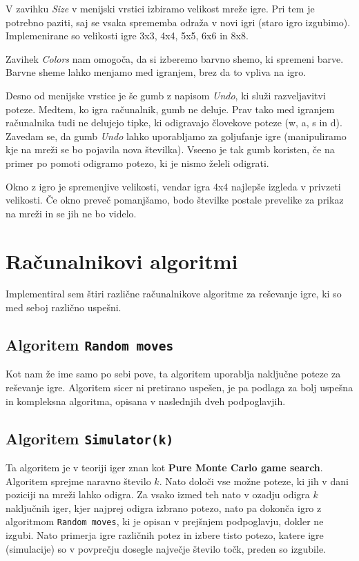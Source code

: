 \documentclass{article}
\begin{document}
V zavihku \emph{Size} v menijski vrstici izbiramo velikost mreže igre. Pri tem je potrebno paziti, saj se vsaka sprememba odraža v novi igri (staro igro izgubimo). Implemenirane so velikosti igre 3x3, 4x4, 5x5, 6x6 in 8x8.

Zavihek \emph{Colors} nam omogoča, da si izberemo barvno shemo, ki spremeni barve. Barvne sheme lahko menjamo med igranjem, brez da to vpliva na igro.

Desno od menijske vrstice je še gumb z napisom \emph{Undo}, ki služi razveljavitvi poteze. Medtem, ko igra računalnik, gumb ne deluje. Prav tako med igranjem računalnika tudi ne delujejo tipke, ki odigravajo človekove poteze (w, a, s in d). Zavedam se, da gumb \emph{Undo} lahko uporabljamo za goljufanje igre (manipuliramo kje na mreži se bo pojavila nova številka). Vseeno je tak gumb koristen, če na primer po pomoti odigramo potezo, ki je nismo želeli odigrati.

Okno z igro je spremenjive velikosti, vendar igra 4x4 najlepše izgleda v privzeti velikosti. Če okno preveč pomanjšamo, bodo številke postale prevelike za prikaz na mreži in se jih ne bo videlo.

\section{Računalnikovi algoritmi}

Implementiral sem štiri različne računalnikove algoritme za reševanje igre, ki so med seboj različno uspešni.

\subsection{Algoritem \texttt{Random moves}}

Kot nam že ime samo po sebi pove, ta algoritem uporablja naključne poteze za reševanje igre. Algoritem sicer ni pretirano uspešen, je pa podlaga za bolj uspešna in kompleksna algoritma, opisana v naslednjih dveh podpoglavjih.

\subsection{Algoritem \texttt{Simulator(k)}}

Ta algoritem je v teoriji iger znan kot \textbf{Pure Monte Carlo game search}. Algoritem sprejme naravno število $k$. Nato določi vse možne poteze, ki jih v dani poziciji na mreži lahko odigra. Za vsako izmed teh nato v ozadju odigra $k$ naključnih iger, kjer najprej odigra izbrano potezo, nato pa dokonča igro z algoritmom \texttt{Random moves}, ki je opisan v prejšnjem podpoglavju, dokler ne izgubi. Nato primerja igre različnih potez in izbere tisto potezo, katere igre (simulacije) so v povprečju dosegle največje število točk, preden so izgubile.
\end{document}
